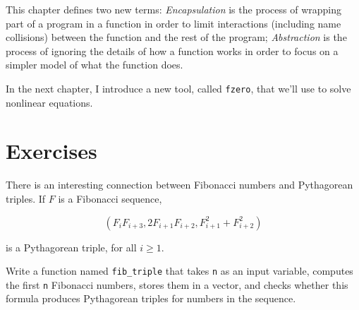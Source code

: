 This chapter defines two new terms: {\em Encapsulation} is the process of wrapping part of a program in
a function in order to limit interactions (including name collisions)
between the function and the rest of the program; {\em Abstraction} is the process of ignoring the details of how a function works in order to focus on a simpler model of what the
function does.

In the next chapter, I introduce a new tool, called {\tt fzero}, that we'll use to solve nonlinear equations.


\section{Exercises}

\begin{ex}

There is an interesting connection between Fibonacci numbers and
Pythagorean triples.  If $F$ is a Fibonacci sequence,

\begin{equation}
(F_i F_{i+3}, 2 F_{i+1} F_{i+2}, F_{i+1}^2 + F_{i+2}^2 )
\end{equation}

is a Pythagorean triple, for all $i \ge 1$.

Write a function named {\tt fib\_triple} that
takes {\tt n} as an input variable, computes 
the first {\tt n} Fibonacci numbers, stores them in a vector,
and checks whether this formula produces Pythagorean triples for numbers in the sequence.

\end{ex}



